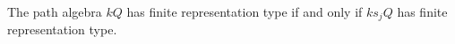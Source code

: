 The path algebra $kQ$ has finite representation type if and only if
$ks_jQ$ has finite representation type.

